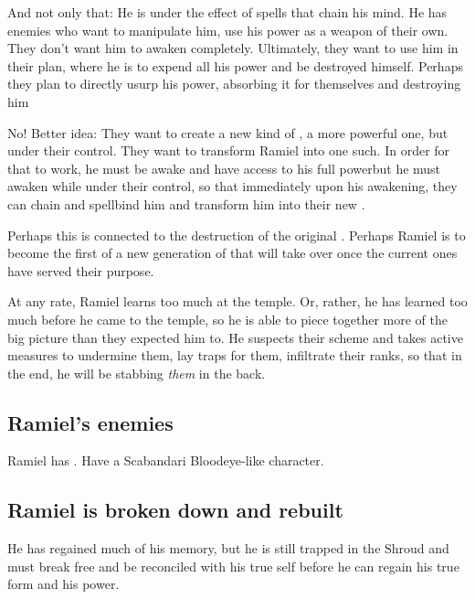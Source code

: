 And not only that: He is under the effect of spells that chain his mind. He has enemies who want to manipulate him, use his power as a weapon of their own. They don't want him to awaken completely. Ultimately, they want to use him in their plan, where he is to expend all his power and be destroyed himself. Perhaps they plan to directly usurp his power, absorbing it for themselves and destroying him\prikker

No! Better idea: They want to create a new kind of \Sephirah, a more powerful one, but under their control. They want to transform Ramiel into one such. In order for that to work, he must be awake and have access to his full \sathariah{} power\prikker but he must awaken while under their control, so that immediately upon his awakening, they can chain and spellbind him and transform him into their new \Sephirah. 

Perhaps this is connected to the destruction of the original \Sephiroth. Perhaps Ramiel is to become the first of a new generation of \Sephiroth{} that will take over once the current ones have served their purpose. 

At any rate, Ramiel learns too much at the temple. Or, rather, he has learned too much before he came to the temple, so he is able to piece together more of the big picture than they expected him to. He suspects their scheme and takes active measures to undermine them, lay traps for them, infiltrate their ranks, so that in the end, he will be stabbing \emph{them} in the back. 







\subsection{Ramiel's enemies}
Ramiel has . 
Have a Scabandari Bloodeye-like character. 







\subsection{Ramiel is broken down and rebuilt}
He has regained much of his memory, but he is still trapped in the Shroud and must break free and be reconciled with his true self before he can regain his true \resphan{} form and his \sathariah{} power. 

